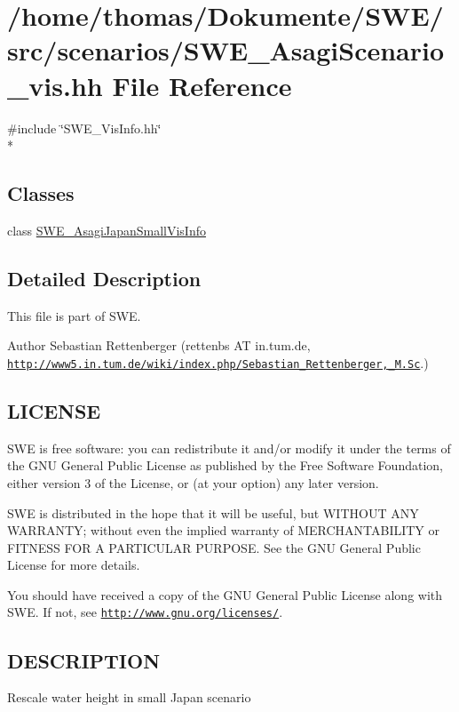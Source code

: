 \hypertarget{SWE__AsagiScenario__vis_8hh}{\section{/home/thomas/\-Dokumente/\-S\-W\-E/src/scenarios/\-S\-W\-E\-\_\-\-Asagi\-Scenario\-\_\-vis.hh File Reference}
\label{SWE__AsagiScenario__vis_8hh}
}
{\ttfamily \#include \char`\"{}S\-W\-E\-\_\-\-Vis\-Info.\-hh\char`\"{}}\\*
\subsection*{Classes}
\begin{DoxyCompactItemize}
\item 
class \hyperlink{classSWE__AsagiJapanSmallVisInfo}{S\-W\-E\-\_\-\-Asagi\-Japan\-Small\-Vis\-Info}
\end{DoxyCompactItemize}


\subsection{Detailed Description}
This file is part of S\-W\-E.

\begin{DoxyAuthor}{Author}
Sebastian Rettenberger (rettenbs A\-T in.\-tum.\-de, \href{http://www5.in.tum.de/wiki/index.php/Sebastian_Rettenberger,_M.Sc}{\tt http\-://www5.\-in.\-tum.\-de/wiki/index.\-php/\-Sebastian\-\_\-\-Rettenberger,\-\_\-\-M.\-Sc}.)
\end{DoxyAuthor}
\hypertarget{Writer_8hh_LICENSE}{}\subsection{L\-I\-C\-E\-N\-S\-E}\label{Writer_8hh_LICENSE}
S\-W\-E is free software\-: you can redistribute it and/or modify it under the terms of the G\-N\-U General Public License as published by the Free Software Foundation, either version 3 of the License, or (at your option) any later version.

S\-W\-E is distributed in the hope that it will be useful, but W\-I\-T\-H\-O\-U\-T A\-N\-Y W\-A\-R\-R\-A\-N\-T\-Y; without even the implied warranty of M\-E\-R\-C\-H\-A\-N\-T\-A\-B\-I\-L\-I\-T\-Y or F\-I\-T\-N\-E\-S\-S F\-O\-R A P\-A\-R\-T\-I\-C\-U\-L\-A\-R P\-U\-R\-P\-O\-S\-E. See the G\-N\-U General Public License for more details.

You should have received a copy of the G\-N\-U General Public License along with S\-W\-E. If not, see \href{http://www.gnu.org/licenses/}{\tt http\-://www.\-gnu.\-org/licenses/}.\hypertarget{NetCdfWriter_8hh_DESCRIPTION}{}\subsection{D\-E\-S\-C\-R\-I\-P\-T\-I\-O\-N}\label{NetCdfWriter_8hh_DESCRIPTION}
Rescale water height in small Japan scenario 